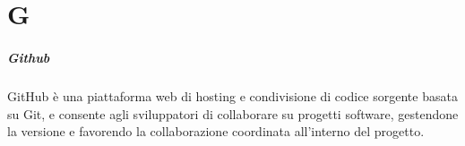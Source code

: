 \chapter{G}
\paragraph*{Github}
GitHub è una piattaforma web di hosting e condivisione di codice sorgente  basata su Git,  e consente agli sviluppatori di collaborare su progetti software, gestendone la versione e favorendo la collaborazione coordinata all'interno del progetto.